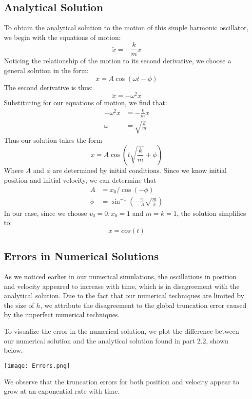 \documentclass{scrartcl}
\begin{document}
\subsection{Analytical Solution}
To obtain the analytical solution to the motion of this simple harmonic oscillator, we begin with the equations of motion:
\[
\ddot{x} = -\frac{k}{m}x
\]
Noticing the relationship of the motion to its second derivative, we choose a general solution in the form:
\[
x = A \cos(\omega t - \phi)
\]
The second derivative is thus:
\[
\ddot{x} = -\omega^2 x
\]
Substituting for our equations of motion, we find that:
\begin{align*}
-\omega^2 x &= -\frac{k}{m}x \\
\omega &= \sqrt{\frac{k}{m}}
\end{align*}
Thus our solution takes the form
\[
x = A \cos\left(t\sqrt{\frac{k}{m}} + \phi\right)
\]
Where $A$ and $\phi$ are determined by initial conditions. Since we know initial position and initial velocity, we can determine that
\begin{align*}
A &= x_0/\cos(-\phi) \\
\phi &= \sin^{-1}\left( -\frac{v_0}{A}\sqrt{\frac{m}{k}} \right)
\end{align*}
In our case, since we choose $v_0 = 0 , x_0 =1$ and $m = k = 1$, the solution simplifies to:
\[
x = cos(t)
\]
\subsection{Errors in Numerical Solutions}
As we noticed earlier in our numerical simulations, the oscillations in position and velocity appeared to increase with time, which is in disagreement with the analytical solution. Due to the fact that our numerical techniques are limited by the size of $h$, we attribute the disagreement to the global truncation error caused by the imperfect numerical techniques.
\par
To visualize the error in the numerical solution, we plot the difference between our numerical solution and the analytical solution found in part 2.2, shown below.
\begin{center}
\texttt{[image: Errors.png]}
\end{center}
We observe that the truncation errors for both position and velocity appear to grow at an exponential rate with time.
\end{document}
